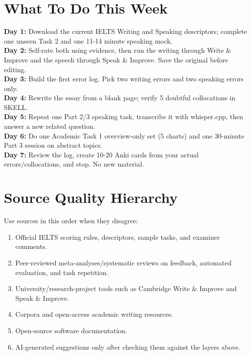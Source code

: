 \documentclass[11pt,a4paper]{article}
\begin{document}
\section{What To Do This Week}

\begin{practicebox}
\textbf{Day 1:} Download the current IELTS Writing and Speaking descriptors; complete one unseen Task 2 and one 11-14 minute speaking mock.\\
\textbf{Day 2:} Self-rate both using evidence, then run the writing through Write \& Improve and the speech through Speak \& Improve. Save the original before editing.\\
\textbf{Day 3:} Build the first error log. Pick two writing errors and two speaking errors only.\\
\textbf{Day 4:} Rewrite the essay from a blank page; verify 5 doubtful collocations in SKELL.\\
\textbf{Day 5:} Repeat one Part 2/3 speaking task, transcribe it with whisper.cpp, then answer a new related question.\\
\textbf{Day 6:} Do one Academic Task 1 overview-only set (5 charts) and one 30-minute Part 3 session on abstract topics.\\
\textbf{Day 7:} Review the log, create 10-20 Anki cards from your actual errors/collocations, and stop. No new material.
\end{practicebox}

\section{Source Quality Hierarchy}

Use sources in this order when they disagree:
\begin{enumerate}
\item Official IELTS scoring rules, descriptors, sample tasks, and examiner comments.
\item Peer-reviewed meta-analyses/systematic reviews on feedback, automated evaluation, and task repetition.
\item University/research-project tools such as Cambridge Write \& Improve and Speak \& Improve.
\item Corpora and open-access academic writing resources.
\item Open-source software documentation.
\item AI-generated suggestions only after checking them against the layers above.
\end{enumerate}
\end{document}
